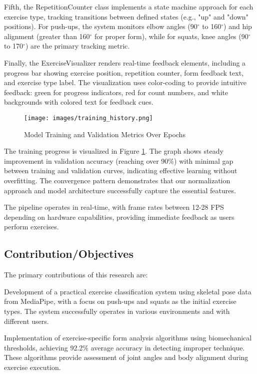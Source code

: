 \documentclass[11pt]{article}
\begin{document}
Fifth, the RepetitionCounter class implements a state machine approach for each exercise type, tracking transitions between defined states (e.g., "up" and "down" positions). For push-ups, the system monitors elbow angles (90$^\circ$ to 160$^\circ$) and hip alignment (greater than 160$^\circ$ for proper form), while for squats, knee angles (90$^\circ$ to 170$^\circ$) are the primary tracking metric.

Finally, the ExerciseVisualizer renders real-time feedback elements, including a progress bar showing exercise position, repetition counter, form feedback text, and exercise type label. The visualization uses color-coding to provide intuitive feedback: green for progress indicators, red for count numbers, and white backgrounds with colored text for feedback cues.

\begin{figure}[htbp]
    \centering
    \texttt{[image: images/training\_history.png]}
    \caption{Model Training and Validation Metrics Over Epochs}
    \label{fig:training_history}
\end{figure}

The training progress is visualized in Figure \ref{fig:training_history}. The graph shows steady improvement in validation accuracy (reaching over 90\%) with minimal gap between training and validation curves, indicating effective learning without overfitting. The convergence pattern demonstrates that our normalization approach and model architecture successfully capture the essential features.

The pipeline operates in real-time, with frame rates between 12-28 FPS depending on hardware capabilities, providing immediate feedback as users perform exercises.

\subsection{Contribution/Objectives}
The primary contributions of this research are:

Development of a practical exercise classification system using skeletal pose data from MediaPipe, with a focus on push-ups and squats as the initial exercise types. The system successfully operates in various environments and with different users.

Implementation of exercise-specific form analysis algorithms using biomechanical thresholds, achieving 92.2\% average accuracy in detecting improper technique. These algorithms provide assessment of joint angles and body alignment during exercise execution.
\end{document}
